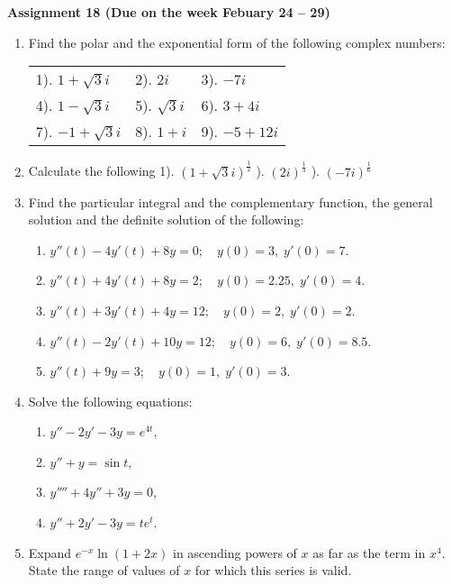 \documentclass{article}
\begin{document}
\fontsize{14}{21}
\selectfont
\centerline{\textbf{Assignment 18 (Due on the week Febuary 24 -- 29)}}
\fontsize{12}{18}
\selectfont
\begin{enumerate}
\item Find the polar and the exponential form of the following complex numbers:

\begin{tabular}{lll}
1). $1+\sqrt{3}i$ & 2). $2i$ & 3). $-7i$\\
4). $1-\sqrt{3}i$ & 5). $\sqrt{3}i$ & 6). $3+4i$\\
7). $-1+\sqrt{3}i$ & 8). $1+i$ & 9). $-5+12i$
\end{tabular}

\item Calculate the following
1). $(1+\sqrt{3}i)^{\frac12}$ ). $(2i)^{\frac13}$ ). $(-7i)^{\frac16}$

\item Find the particular integral and the complementary function, the general solution and the definite solution of the following:
\begin{enumerate}
\item $y''(t)-4y'(t)+8y=0;\quad y(0)=3,\; y'(0)=7$.
\item $y''(t)+4y'(t)+8y=2;\quad y(0)=2.25,\; y'(0)=4$.
\item $y''(t)+3y'(t)+4y=12;\quad y(0)=2,\; y'(0)=2$.
\item $y''(t)-2y'(t)+10y=12;\quad y(0)=6,\; y'(0)=8.5$.
\item $y''(t)+9y=3;\quad y(0)=1,\; y'(0)=3$.
\end{enumerate}


\item Solve the following equations:
\begin{enumerate}
\item $y''-2y'-3y=e^{4t}$,
\item $y''+y=\sin t$,
\item $y''''+4y''+3y=0$,
\item $y''+2y'-3y=te^t$.
\end{enumerate}
\item Expand $e^{-x}\ln(1+2x)$ in ascending powers of $x$ as far as the term in $x^4$. State the range of values of $x$ for which this series is valid.
\end{enumerate}
\end{document}
